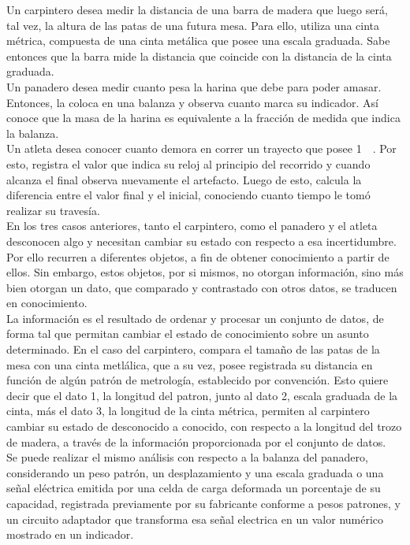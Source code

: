 Un carpintero desea medir la distancia de una barra de madera que luego será, tal vez, la altura de las patas de una futura mesa. Para ello, utiliza una cinta métrica, compuesta de una cinta metálica que posee una escala graduada. Sabe entonces que la barra mide la distancia que coincide con la distancia de la cinta graduada.\\

Un panadero desea medir cuanto pesa la harina que debe para poder amasar. Entonces, la coloca en una balanza y observa cuanto marca su indicador. Así conoce que la masa de la harina es equivalente a la fracción de medida que indica la balanza.\\

Un atleta desea conocer cuanto demora en correr un trayecto que posee \SI{1}{\kilo\metro}. Por esto, registra el valor que indica su reloj al principio del recorrido y cuando alcanza el final observa nuevamente el artefacto. Luego de esto, calcula la diferencia entre el valor final y el inicial, conociendo cuanto tiempo le tomó realizar su travesía.\\

En los tres casos anteriores, tanto el carpintero, como el panadero y el atleta desconocen algo y necesitan cambiar su estado con respecto a esa incertidumbre. Por ello recurren a diferentes objetos, a fin de obtener conocimiento a partir de ellos. Sin embargo, estos objetos, por si mismos, no otorgan información, sino más bien otorgan un dato, que comparado y contrastado con otros datos, se traducen en conocimiento.\\

La información es el resultado de ordenar y procesar un conjunto de datos, de forma tal que permitan cambiar el estado de conocimiento sobre un asunto determinado. En el caso del carpintero, compara el tamaño de las patas de la mesa con una cinta metlálica, que a su vez, posee registrada su distancia en función de algún patrón de metrología, establecido por convención. Esto quiere decir que el dato 1, la longitud del patron, junto al dato 2, escala graduada de la cinta, más el dato 3, la longitud de la cinta métrica, permiten al carpintero cambiar su estado de desconocido a conocido, con respecto a la longitud del trozo de madera, a través de la información proporcionada por el conjunto de datos.\\

Se puede realizar el mismo análisis con respecto a la balanza del panadero, considerando un peso patrón, un desplazamiento y una escala graduada o una señal eléctrica emitida por una celda de carga deformada un porcentaje de su capacidad, registrada previamente por su fabricante conforme a pesos patrones, y un circuito adaptador que transforma esa señal electrica en un valor numérico mostrado en un indicador.\\

